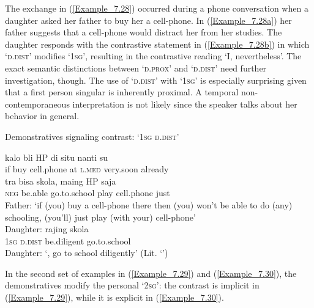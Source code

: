 {The exchange in (\ref{Example_7.28}) occurred during a phone conversation when a daughter asked her father to buy her a cell-phone. In (\ref{Example_7.28a}) her father suggests that a cell-phone would distract her from her studies. The daughter responds with the contrastive statement in (\ref{Example_7.28b}) in which  ‘\textsc{d.dist}’ modifies  ‘\textsc{1sg}’, resulting in the contrastive reading  ‘I, nevertheless’. The exact semantic distinctions between  ‘\textsc{d.prox}’ and  ‘\textsc{d.dist}’ need further investigation, though. The use of  ‘\textsc{d.dist}’ with  ‘\textsc{1sg}’ is especially surprising given that a first person singular  is inherently proximal. A temporal non-contemporaneous interpretation is not likely since the speaker talks about her behavior in general.


\begin{styleExampleTitle}
Demonstratives signaling contrast:  ‘\textsc{1sg} \textsc{d.dist}’
\end{styleExampleTitle}

\ea
\label{Example_7.28}

\ea
\label{Example_7.28a}
 {kalo} {bli} {{HP}} {di} {{situ}} {{nanti}} {{su}}\\ %
 { }     if  buy  {cell.phone}  at  {\textsc{l.med}}  {very.soon}  {already}\\
 \gll    tra  {bisa}  {skola,}  {maing}  {HP}  saja\\
     \textsc{neg}  {be.able}  {go.to.school}  {play}  {cell.phone}  just\\
\glt Father: ‘if (you) buy a cell-phone there then (you) won’t be able to do (any) schooling, (you’ll) just play (with your) cell-phone’\\
\vspace{5pt}
\ex
\label{Example_7.28b}
\gll  Daughter:      rajing  skola\\
 { }      \textsc{1sg}  \textsc{d.dist}  be.diligent  go.to.school\\
\glt Daughter: ‘, go to school diligently’ (Lit. ‘’) \textstyleExampleSource{[080922-001a-CvPh.0448/0455]}
\z
\z



In the second set of examples in (\ref{Example_7.29}) and (\ref{Example_7.30}), the demonstratives modify the personal   ‘\textsc{2sg}’: the contrast is implicit in (\ref{Example_7.29}), while it is explicit in (\ref{Example_7.30}).



}
